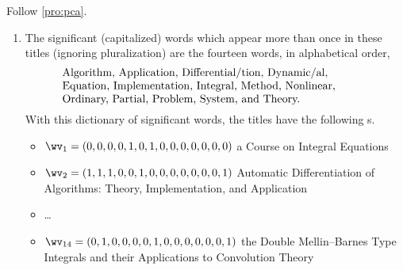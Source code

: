 \begin{reduce}
{\begin{center}
{ }
\end{center}
}%
Follow \cref{pro:pca}.
\begin{enumerate}
\item  The significant (capitalized) words which appear more than once in these titles (ignoring pluralization) are the fourteen words, in alphabetical order,
\begin{equation}
\parbox{0.8\linewidth}{\raggedright
Algorithm,
Application,
Differential/tion,
Dynamic/al,
Equation,
Implementation,
Integral,
Method,
Nonlinear,
Ordinary,
Partial,
Problem,
System, and
Theory.}
\label{eq:lsidict}
\end{equation}
With this dictionary of significant words, the titles have the following s.
\begin{itemize}
\item \(\wv_1=(0,0,0,0,1,0,1,0,0,0,0,0,0,0)\) a Course on Integral Equations
\item \(\wv_2=(1,1,1,0,0,1,0,0,0,0,0,0,0,1)\) Automatic Differentiation of Algorithms: Theory, Implementation, and Application
\item \ldots
\item \(\wv_{14}=(0,1,0,0,0,0,1,0,0,0,0,0,0,1)\) the Double Mellin--Barnes Type Integrals and their Applications to Convolution Theory
\end{itemize}



\end{enumerate}
\end{reduce}
